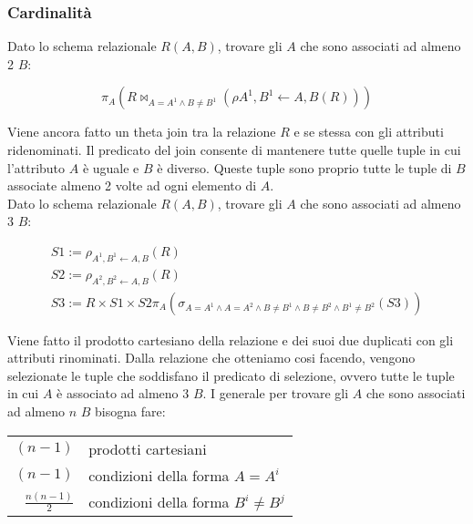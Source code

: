 \subsubsection{Cardinalità}

Dato lo schema relazionale $R(A,B)$, trovare gli $A$ che sono associati ad almeno 2 $B$:

\begin{displaymath}
  \pi_{A}(R \bowtie_{A=A^1 \land B \neq B^1}(\rho{A^1,B^1 \leftarrow A,B}(R)))
\end{displaymath}

Viene ancora fatto un theta join tra la relazione $R$ e se stessa con gli attributi
ridenominati. Il predicato del join consente di mantenere tutte quelle tuple in cui
l'attributo $A$ è uguale e $B$ è diverso. Queste tuple sono proprio tutte le tuple di $B$
associate almeno 2 volte ad ogni elemento di $A$. \\

\noindent
Dato lo schema relazionale $R(A,B)$, trovare gli $A$ che sono associati ad almeno 3 $B$:

\begin{gather*}
  S1 := \rho_{A^1,B^1 \leftarrow A,B}(R) \\
  S2 := \rho_{A^2,B^2 \leftarrow A,B}(R) \\
  S3 := R \times S1 \times S2
  \pi_{A}(\sigma_{A=A^1 \land A=A^2 \land B \neq B^1 \land B \neq B^2 \land B^1 \neq B^2}(S3))
\end{gather*}

Viene fatto il prodotto cartesiano della relazione e dei suoi due duplicati con gli attributi
rinominati. Dalla relazione che otteniamo cosi facendo, vengono selezionate le tuple che
soddisfano il predicato di selezione, ovvero tutte le tuple in cui $A$ è associato ad almeno
3 $B$. I generale per trovare gli $A$ che sono associati ad almeno $n$ $B$ bisogna fare: \\
\begin{center}
  \begin{tabular}{|r|l|}
    \hline
    $(n-1)$ & prodotti cartesiani \\
    $(n-1)$ & condizioni della forma $A=A^i$ \\
    $\frac{n(n-1)}{2}$ & condizioni della forma $B^i \neq B^j$ \\
    \hline
  \end{tabular}
\end{center}